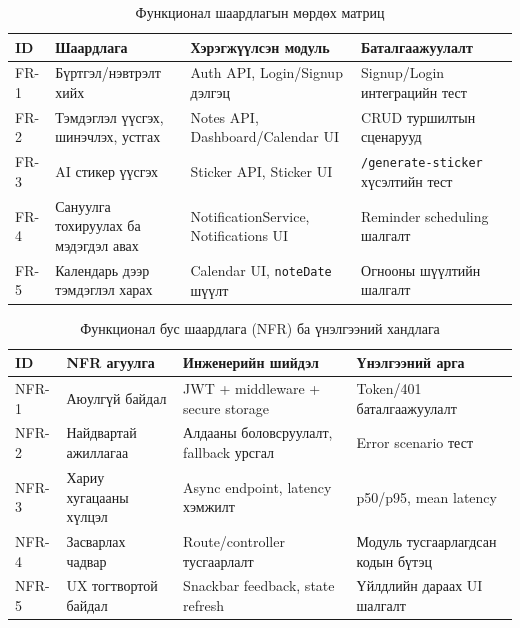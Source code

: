 \begin{table}[H]
\centering
\caption{Функционал шаардлагын мөрдөх матриц}
\label{tab:functional_requirements_trace}
\small
\setlength{\tabcolsep}{4pt}
\renewcommand{\arraystretch}{1.15}
\begin{tabularx}{\textwidth}{>{\raggedright\arraybackslash}p{1.6cm}>{\raggedright\arraybackslash}X>{\raggedright\arraybackslash}p{3.6cm}>{\raggedright\arraybackslash}p{2.4cm}}
\toprule
\textbf{ID} & \textbf{Шаардлага} & \textbf{Хэрэгжүүлсэн модуль} & \textbf{Баталгаажуулалт} \\
\midrule
FR-1 & Бүртгэл/нэвтрэлт хийх & Auth API, Login/Signup дэлгэц & Signup/Login интеграцийн тест \\
FR-2 & Тэмдэглэл үүсгэх, шинэчлэх, устгах & Notes API, Dashboard/Calendar UI & CRUD туршилтын сценарууд \\
FR-3 & AI стикер үүсгэх & Sticker API, Sticker UI & \texttt{/generate-sticker} хүсэлтийн тест \\
FR-4 & Сануулга тохируулах ба мэдэгдэл авах & NotificationService, Notifications UI & Reminder scheduling шалгалт \\
FR-5 & Календарь дээр тэмдэглэл харах & Calendar UI, \texttt{noteDate} шүүлт & Огнооны шүүлтийн шалгалт \\
\bottomrule
\end{tabularx}
\normalsize
\end{table}

\begin{table}[H]
\centering
\caption{Функционал бус шаардлага (NFR) ба үнэлгээний хандлага}
\label{tab:nfr_requirements_trace}
\small
\setlength{\tabcolsep}{4pt}
\renewcommand{\arraystretch}{1.15}
\begin{tabularx}{\textwidth}{>{\raggedright\arraybackslash}p{1.8cm}>{\raggedright\arraybackslash}X>{\raggedright\arraybackslash}p{3.8cm}>{\raggedright\arraybackslash}p{2.2cm}}
\toprule
\textbf{ID} & \textbf{NFR агуулга} & \textbf{Инженерийн шийдэл} & \textbf{Үнэлгээний арга} \\
\midrule
NFR-1 & Аюулгүй байдал & JWT + middleware + secure storage & Token/401 баталгаажуулалт \\
NFR-2 & Найдвартай ажиллагаа & Алдааны боловсруулалт, fallback урсгал & Error scenario тест \\
NFR-3 & Хариу хугацааны хүлцэл & Async endpoint, latency хэмжилт & p50/p95, mean latency \\
NFR-4 & Засварлах чадвар & Route/controller тусгаарлалт & Модуль тусгаарлагдсан кодын бүтэц \\
NFR-5 & UX тогтвортой байдал & Snackbar feedback, state refresh & Үйлдлийн дараах UI шалгалт \\
\bottomrule
\end{tabularx}
\normalsize
\end{table}

